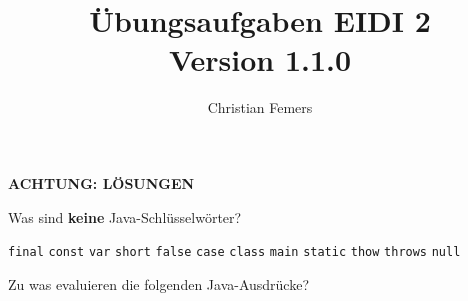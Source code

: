 \documentclass[11pt]{exam} %
\title{Übungsaufgaben EIDI 2 \\ \small \color{magenta}Version 1.1.0}
\author{Christian Femers}
\newcommand{\code}[1]{\texttt|#1|}
\newcommand{\fillinline}[1]{\ifprintanswers\fillin[\code{#1}][3cm]\fi\xrfill[-1pt]{0.2mm}}
\begin{document}
\maketitle


\ifprintanswers
\begin{framed}{\vspace{8.5cm}\begin{center}\color{red}\textbf{ACHTUNG: LÖSUNGEN}\end{center}\vspace{8.75cm}}\end{framed}
\newpage
\fi

\begin{questions}
\question Was sind \textbf{keine} Java-Schlüsselwörter?
\begin{checkboxes}
\choice \texttt{final}
\CorrectChoice \texttt{const}
\CorrectChoice \texttt{var}
\choice \texttt{short}
\CorrectChoice \texttt{false}
\choice \texttt{case}
\choice \texttt{class}
\CorrectChoice \texttt{main}
\choice \texttt{static}
\choice \texttt{thow}
\choice \texttt{throws}
\CorrectChoice \texttt{null}
\end{checkboxes}
\filbreak
\question Zu was evaluieren die folgenden Java-Ausdrücke? 
\end{questions}
\end{document}

